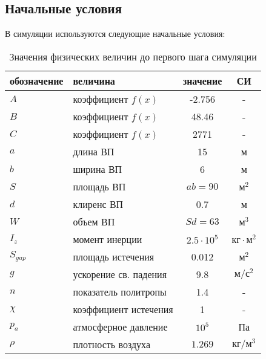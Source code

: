 \documentclass{article}%
\numberwithin{equation}{subsection}
\let\oldsubsection\subsection%
\renewcommand{\subsection}{%
  \renewcommand{\theequation}{\thesubsection.\arabic{equation}}%
  \oldsubsection}%
\begin{document}
\subsection{Начальные условия}
В симуляции используются следующие начальные условия:
\begin{table}[h]
    \caption{Значения физических величин до первого шага симуляции}
    \centering
    \begin{tabular}{@{}llcc@{}}
        \toprule
        обозначение & величина & значение & СИ\\
        \midrule
        $A$ & коэффициент $f(x)$ & -2.756 & -\\
        \midrule
        $B$ & коэффициент $f(x)$ & 48.46 & -\\
        \midrule
        $C$ & коэффициент $f(x)$ & 2771 & -\\
        \midrule
        $a$ & длина ВП & 15 & м\\
        \midrule
        $b$ & ширина ВП & 6 & м\\
        \midrule
        $S$ & площадь ВП & $ab=90$ & $\text{м}^2$\\
        \midrule
        $d$ & клиренс ВП & 0.7 & м\\
        \midrule
        $W$ & объем ВП & $Sd=63$ & $\text{м}^3$\\
        \midrule
        $I_z$ & момент инерции & $2.5\cdot 10^5$ & $\text{кг}\cdot\text{м}^2$\\
        \midrule
        $S_{gap}$ & площадь истечения & 0.012 & $\text{м}^2$\\
        \midrule
        $g$ & ускорение св. падения & 9.8 & $\text{м}/\text{с}^2$\\
        \midrule
        $n$ & показатель политропы & 1.4 & -\\
        \midrule
        $\chi$ & коэффициент истечения & 1 & -\\
        \midrule
        $p_a$ & атмосферное давление & $10^5$ & Па\\
        \midrule
        $\rho$ & плотность воздуха & $1.269$ & $\text{кг}/\text{м}^3$\\
        \bottomrule
    \end{tabular}
\end{table}
\end{document}
